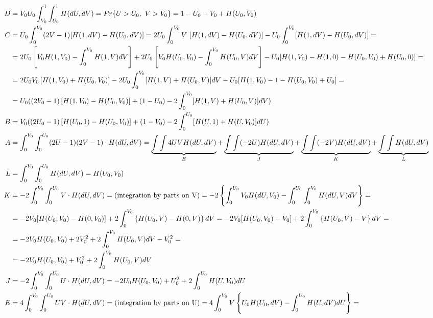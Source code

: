 \documentclass[]{article}
\begin{document}
{\scriptsize{
	$$
	\begin{aligned}
    D &= V_0 U_0 \int_{V_0}^{1}\int_{U_0}^1 H(dU, dV) = Pr\{ U > U_0,~V > V_0\} = 1 - U_0 - V_0  + H(U_0, V_0)\\
    C &= U_0\int_{0}^{V_0} (2V - 1)[H(1, dV) - H(U_0, dV)] =  2 U_0\int_{0}^{V_0} V ~[H(1, dV) - H(U_0, dV)]  - U_0\int_{0}^{V_0} [H(1, dV) - H(U_0, dV)] = \\
    &=2 U_0 \left[V_0 H(1, V_0) - \int_0^{V_0} H(1, V)dV  \right]  + 2 U_0   \left[V_0 H(U_0, V_0) - \int_0^{V_0} H(U_0, V)dV  \right] - U_0[H(1, V_0) - H(1, 0) - H(U_0, V_0) + H(U_0, 0)] = \\
    &=2 U_0 V_0 \left[H(1, V_0) + H(U_0, V_0)\right] - 2U_0\int_0^{V_0} [H(1, V) + H(U_0, V)]dV   - U_0[H(1, V_0) - 1 - H(U_0, V_0) + U_0] =\\
    &= U_0 \large(  (2V_0 - 1) \left[H(1, V_0) - H(U_0, V_0)\right]  + (1 - U_0) - 2\int_0^{V_0} [H(1, V) + H(U_0, V)]dV  \large)\\
    B &= V_0 \large(  (2U_0 - 1) \left[H(U_0, 1) - H(U_0, V_0)\right]  + (1 - V_0) - 2\int_0^{U_0} [H(U, 1) + H(U, V_0)]dU  \large)\\
    A &= \int_0^{V_0}\int_0^{U_0} (2U - 1)(2V - 1)\cdot H(dU, dV) =  \underbrace{\int\int 4UV H(dU, dV)}_{E} + \underbrace{\int\int (-2U) H(dU, dV)}_{J} + \underbrace{\int\int (-2V) H(dU, dV)}_{K} + \underbrace{\int\int H(dU, dV)}_{L}\\
    L &= \int_0^{V_0}\int_0^{U_0} H(dU, dV) = H(U_0, V_0)\\
    K &= -2\int_0^{V_0}\int_0^{U_0} V \cdot H(dU, dV) = \text{(integration by parts on V)} = -2 \left\{    \int_0^{U_0}V_0 H(dU, V_0) - \int_0^{U_0} \int_0^{V_0} H(dU, V) dV    \right\} =\\
    &= -2  V_0 [H(U_0, V_0) - H(0, V_0)] +  2 \int_0^{V_0} \left\{ H(U_0, V) - H(0, V)  \right\} dV =  -2  V_0 [H(U_0, V_0) - V_0] +  2 \int_0^{V_0} \left\{ H(U_0, V) - V  \right\} dV = \\
    &=  -2  V_0 H(U_0, V_0) + 2V_0^2 +  2 \int_0^{V_0}  H(U_0, V)dV - V_0^2 = \\
    &=  -2  V_0 H(U_0, V_0) + V_0^2 +  2 \int_0^{V_0}  H(U_0, V)dV \\
    J &= -2\int_0^{V_0}\int_0^{U_0} U  \cdot H(dU, dV) = -2  U_0 H(U_0, V_0) + U_0^2 +  2 \int_0^{U_0}  H(U, V_0)dU \\
    E &= 4\int_0^{V_0}\int_0^{U_0} U V \cdot  H(dU, dV)  = \text{(integration by parts on U)} = 4\int_0^{V_0} V \left\{  U_0H(U_0, dV)  -  \int_0^{U_0} H(U, dV)dU  \right\} =\\

\end{aligned}$$}}
\end{document}
